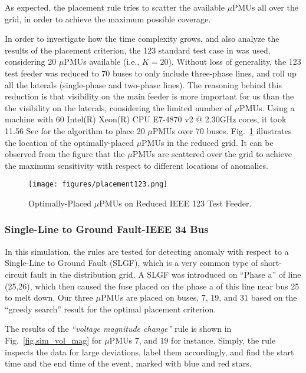\documentclass[twocolumn]{IEEEtran}
\newcommand{\mup}{\mu \text{PMU}}
\begin{document}
As expected, the placement rule tries to scatter the available $\mup$s all over the grid, in order to achieve the maximum possible coverage. 

In order to investigate how the time complexity grows, and also analyze the results of the placement criterion, the 123 standard test case in \cite{ieee34} was used, considering 20 $\mup$s available (i.e., $K=20$). Without loss of generality, the 123 test feeder was reduced to 70 buses to only include three-phase lines, and roll up all the laterals (single-phase and two-phase lines). The reasoning behind this reduction is that visibility on the main feeder is more important for us than the the visibility on the laterals, considering the limited number of $\mup$s. Using a  machine with 60 Intel(R) Xeon(R) CPU E7-4870 v2 @ 2.30GHz cores, it took 11.56 Sec for the algorithm to place 20 $\mup$s over 70 buses. Fig.~\ref{fig.placement123} illustrates the location of the optimally-placed $\mup$s in the reduced grid. It can be observed from the figure that the $\mup$s are scattered over the grid to achieve the maximum sensitivity with respect to different locations of anomalies. 
\begin{figure}[ht]
\centering 
\texttt{[image: figures/placement123.png]}
\caption{ Optimally-Placed $\mup$s on Reduced IEEE 123 Test Feeder.}
\label{fig.placement123}
\end{figure}      

\subsubsection{Single-Line to Ground Fault-IEEE 34 Bus} In this simulation, the rules are tested for detecting anomaly with respect to a
Single-Line to Ground Fault (SLGF), which is a very common type of short-circuit fault in the distribution grid. A SLGF was introduced on ``Phase a'' of line (25,26), which then caused the fuse placed on the phase a of this line near bus 25 to melt down. Our three $\mup$s are placed on buses, 7, 19, and 31 based on the ``greedy search'' result for the optimal placement criterion. 

The results of the \textit{``voltage magnitude change''} rule is shown in Fig.~\ref{fig.sim_vol_mag} for $\mup$s 7, and 19 for instance. Simply, the rule inspects the data for large deviations, label them accordingly, and find the start time and the end time of the event, marked with blue and red stars.
  
\end{document}
